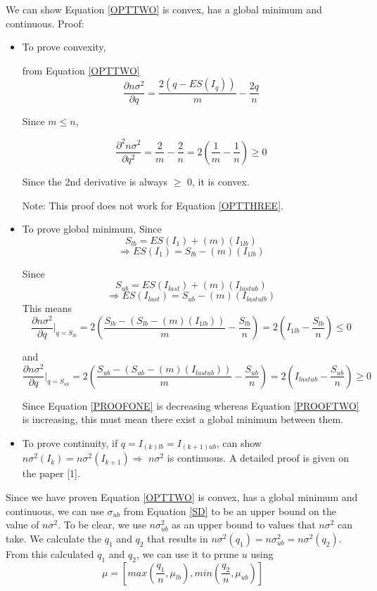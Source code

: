\documentclass[a4paper,12pt]{article}
\begin{document}
We can show Equation \ref{OPTTWO} is convex, has a global minimum and continuous. 
Proof: 
\begin{itemize}
\item  To prove convexity, 

from Equation \ref{OPTTWO}
$$\frac{\partial n \sigma^2}{\partial q} = \frac{2(q - ES(I_{q}))}{m} - \frac{2q}{n} $$

Since $m \leq n$,

$$ \frac{\partial^2 n \sigma^2}{\partial q^2} = \frac{2}{m} - \frac{2}{n} = 2(\frac{1}{m} - \frac{1}{n}) \geq 0
$$

Since the 2nd derivative is always $\geq$ 0, it is convex. 

Note: This proof does not work for Equation \ref{OPTTHREE}. 

\item To prove global minimum, 
Since $$S_{lb} = ES(I_{1}) + (m)(I_{1lb})$$
$$\Rightarrow ES(I_{1}) = S_{lb} - (m)(I_{1lb})$$

Since $$S_{ub} = ES(I_{last}) + (m)(I_{lastub})$$
$$\Rightarrow ES(I_{last}) = S_{ub} - (m)(I_{lastulb})$$
This means 
\begin{equation}
\label{PROOFONE}
\frac{\partial n \sigma^2}{\partial q}|_{q=S_{lb}} 
= 2(\frac{S_{lb} - (S_{lb} - (m)(I_{1lb}))}{m} - \frac{S_{lb}}{n})
= 2(I_{1lb} - \frac{S_{lb}}{n}) \leq 0
\end{equation} 

and
\begin{equation}
\label{PROOFTWO}
\frac{\partial n \sigma^2}{\partial q}|_{q=S_{ub}} 
= 2(\frac{S_{ub} - (S_{ub} - (m)(I_{lastub}))}{m} - \frac{S_{ub}}{n})
= 2(I_{lastub} - \frac{S_{ub}}{n}) \geq 0
\end{equation} 

Since Equation \ref{PROOFONE} is decreasing whereas Equation \ref{PROOFTWO} is increasing, 
this must mean there exist a global minimum between them. 

\item To prove continuity,
if $q = I_{(k)lb} = I_{(k+1)ub}$, can show $n\sigma^2(I_{k}) = n\sigma^2(I_{k+1})
\Rightarrow$ $n\sigma^2$ is continuous. A detailed proof is given on the paper [1]. 
\end{itemize}

Since we have proven Equation \ref{OPTTWO} is convex, has a global minimum and continuous, we can use $\sigma_{ub}$ from Equation \ref{SD} to  be an upper bound on the value of $n\sigma^2$. To be clear, we use $n\sigma_{ub}^2$ as an upper bound to values that $n\sigma^2$ can take. We calculate the $q_{1}$ and $q_{2}$ that results in $n\sigma^2(q_{1}) = n\sigma_{ub}^2 = n\sigma^2(q_{2})$. From this calculated $q_{1}$ and $q_{2}$, we can use it to prune $u$ using 
\begin{equation}
\mu = [max(\frac{q_{1}}{n}, \mu_{lb}) , min(\frac{q_{2}}{n}, \mu_{ub})]
\end{equation} 
\end{document}
